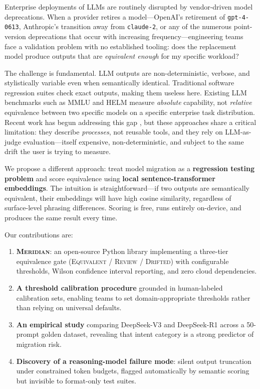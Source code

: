 \documentclass[11pt,a4paper]{article}
\begin{document}
Enterprise deployments of LLMs are routinely disrupted by vendor-driven model
deprecations.
When a provider retires a model---OpenAI's retirement of \texttt{gpt-4-0613},
Anthropic's transition away from \texttt{claude-2}, or any of the numerous
point-version deprecations that occur with increasing frequency---engineering teams
face a validation problem with no established tooling: does the replacement model
produce outputs that are \emph{equivalent enough} for my specific workload?

The challenge is fundamental.
LLM outputs are non-deterministic, verbose, and stylistically variable even when
semantically identical.
Traditional software regression suites check exact outputs, making them useless here.
Existing LLM benchmarks such as MMLU and HELM measure \emph{absolute} capability,
not \emph{relative} equivalence between two specific models on a specific enterprise
task distribution.
Recent work has begun addressing this gap
\citep{arXiv2604.27082, arXiv2507.05573, arXiv2604.27789}, but these approaches
share a critical limitation: they describe \emph{processes}, not reusable tools,
and they rely on LLM-as-judge evaluation---itself expensive, non-deterministic,
and subject to the same drift the user is trying to measure.

We propose a different approach: treat model migration as a \textbf{regression testing
problem} and score equivalence using \textbf{local sentence-transformer embeddings}.
The intuition is straightforward---if two outputs are semantically equivalent, their
embeddings will have high cosine similarity, regardless of surface-level phrasing
differences.
Scoring is free, runs entirely on-device, and produces the same result every time.

Our contributions are:
\begin{enumerate}
  \item \textbf{\textsc{Meridian}}: an open-source Python library implementing a
    three-tier equivalence gate (\textsc{Equivalent} / \textsc{Review} / \textsc{Drifted})
    with configurable thresholds, Wilson confidence interval reporting, and zero cloud
    dependencies.
  \item \textbf{A threshold calibration procedure} grounded in human-labeled
    calibration sets, enabling teams to set domain-appropriate thresholds rather
    than relying on universal defaults.
  \item \textbf{An empirical study} comparing DeepSeek-V3 and DeepSeek-R1 across
    a 50-prompt golden dataset, revealing that intent category is a strong predictor
    of migration risk.
  \item \textbf{Discovery of a reasoning-model failure mode}: silent output truncation
    under constrained token budgets, flagged automatically by semantic scoring but
    invisible to format-only test suites.
\end{enumerate}
\end{document}

